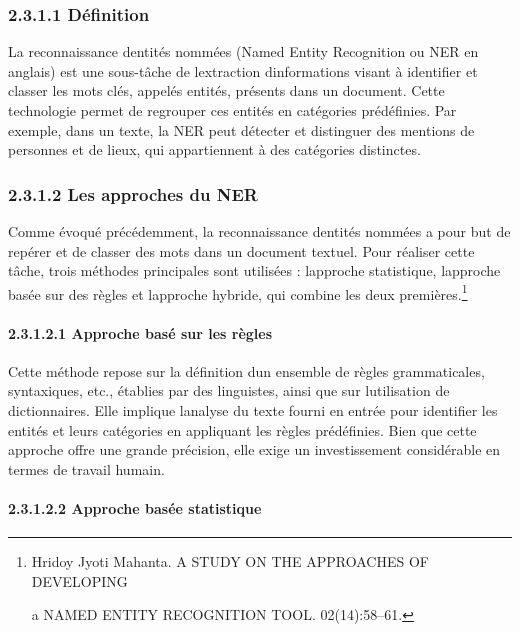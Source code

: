 \documentclass[
]{article}
\begin{document}
\subsubsection{2.3.1.1 Définition}\label{duxe9finition}

La reconnaissance d\textquotesingle entités nommées (Named Entity
Recognition ou NER en anglais) est une sous-tâche de
l\textquotesingle extraction d\textquotesingle informations visant à
identifier et classer les mots clés, appelés entités, présents dans un
document. Cette technologie permet de regrouper ces entités en
catégories prédéfinies. Par exemple, dans un texte, la NER peut détecter
et distinguer des mentions de personnes et de lieux, qui appartiennent à
des catégories distinctes.

\subsubsection{\texorpdfstring{2.3.1.2 Les approches du NER
}{2.3.1.2 Les approches du NER }}\label{les-approches-du-ner}

Comme évoqué précédemment, la reconnaissance d\textquotesingle entités
nommées a pour but de repérer et de classer des mots dans un document
textuel. Pour réaliser cette tâche, trois méthodes principales sont
utilisées : l\textquotesingle approche statistique,
l\textquotesingle approche basée sur des règles et
l\textquotesingle approche hybride, qui combine les deux
premières.\footnote{Hridoy Jyoti Mahanta. A STUDY ON THE APPROACHES OF
  DEVELOPING

  a NAMED ENTITY RECOGNITION TOOL. 02(14):58--61.}

\paragraph{2.3.1.2.1 Approche basé sur les
règles}\label{approche-basuxe9-sur-les-ruxe8gles}

Cette méthode repose sur la définition d\textquotesingle un ensemble de
règles grammaticales, syntaxiques, etc., établies par des linguistes,
ainsi que sur l\textquotesingle utilisation de dictionnaires. Elle
implique l\textquotesingle analyse du texte fourni en entrée pour
identifier les entités et leurs catégories en appliquant les règles
prédéfinies. Bien que cette approche offre une grande précision, elle
exige un investissement considérable en termes de travail humain.

\paragraph{2.3.1.2.2 Approche basée
statistique}\label{approche-basuxe9e-statistique}
\end{document}
